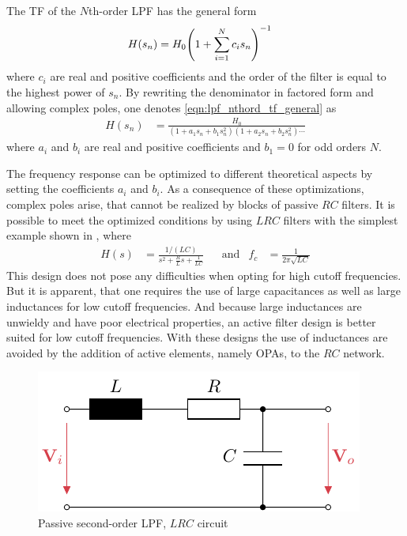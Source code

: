 The \ac{TF} of the $N$th-order \ac{LPF} has the general form
\begin{align}
  H(s_n) &= H_0 \pqty{1 + \sum\limits_{i=1}^N c_i s_n}^{-1} \label{eqn:lpf_nthord_tf_general}
\end{align}
where $c_i$ are real and positive coefficients and the order of the filter is equal to the highest power of $s_n$. By rewriting the denominator in factored form and allowing complex poles, one denotes \autoref{eqn:lpf_nthord_tf_general} as
\begin{align}
  H(s_n) &= \frac{H_0}{(1+a_1s_n+b_1s_n^2)(1+a_2s_n+b_2s_n^2)\cdots} \label{eqn:lpf_nthord_tf_poles}
\end{align}
where $a_i$ and $b_i$ are real and positive coefficients and $b_1=0$ for odd orders $N$.

The frequency response can be optimized to different theoretical aspects by setting the coefficients $a_i$ and $b_i$. As a consequence of these optimizations, complex poles arise, that cannot be realized by blocks of passive $RC$ filters. It is possible to meet the optimized conditions by using $LRC$ filters with the simplest example shown in , where
\begin{align}
  H(s) &= \frac{1/(LC)}{s^2+\frac{R}{L}s+\frac{1}{LC}} &&\text{and} &f_c &= \frac{1}{2\pi\sqrt{LC}}
\end{align}
This design does not pose any difficulties when opting for high cutoff frequencies. But it is apparent, that one requires the use of large capacitances as well as large inductances for low cutoff frequencies. And because large inductances are unwieldy and have poor electrical properties, an active filter design is better suited for low cutoff frequencies. With these designs the use of inductances are avoided by the addition of active elements, namely \ac{OPA}s, to the $RC$ network.

\begin{figure}[htb!]
  \centering
  \includegraphics[scale=1]{figures/electronics/lowpass/lp_passive_2ord/lp_passive_2ord}
  \caption[Passive second-order \ac{LPF}]{Passive second-order \ac{LPF}, $LRC$ circuit%
    \label{fig:lp_passive_2ord}}
\end{figure}

